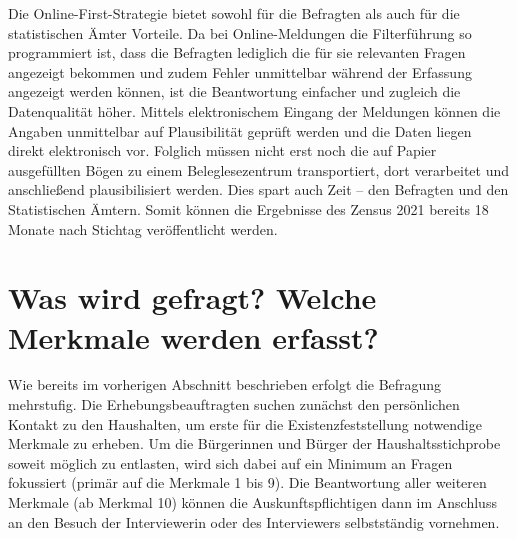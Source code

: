 Die Online-First-Strategie bietet sowohl für die Befragten als auch für die statistischen Ämter Vorteile. Da bei Online-Meldungen die Filterführung so programmiert ist, dass die Befragten lediglich die für sie relevanten Fragen angezeigt bekommen und zudem Fehler unmittelbar während der Erfassung angezeigt werden können, ist die Beantwortung einfacher und zugleich die Datenqualität höher. Mittels elektronischem Eingang der Meldungen können die Angaben unmittelbar auf Plausibilität geprüft werden und die Daten liegen direkt elektronisch vor. Folglich müssen nicht erst noch die auf Papier ausgefüllten Bögen zu einem Beleglesezentrum transportiert, dort verarbeitet und anschließend plausibilisiert werden. Dies spart auch Zeit – den Befragten und den Statistischen Ämtern. Somit können die Ergebnisse des Zensus 2021 bereits 18 Monate nach Stichtag veröffentlicht werden.\par

\section[Was wird gefragt?]{Was wird gefragt? Welche Merkmale werden erfasst?}
Wie bereits im vorherigen Abschnitt beschrieben erfolgt die Befragung mehrstufig. Die Erhebungsbeauftragten suchen zunächst den persönlichen Kontakt zu den Haushalten, um erste für die Existenzfeststellung notwendige Merkmale zu erheben. Um die Bürgerinnen und Bürger der Haushaltsstichprobe soweit möglich zu entlasten, wird sich dabei auf ein Minimum an Fragen fokussiert (primär auf die Merkmale 1 bis 9). Die Beantwortung aller weiteren Merkmale (ab Merkmal 10) können die Auskunftspflichtigen dann im Anschluss an den Besuch der Interviewerin oder des Interviewers selbstständig vornehmen.\par

